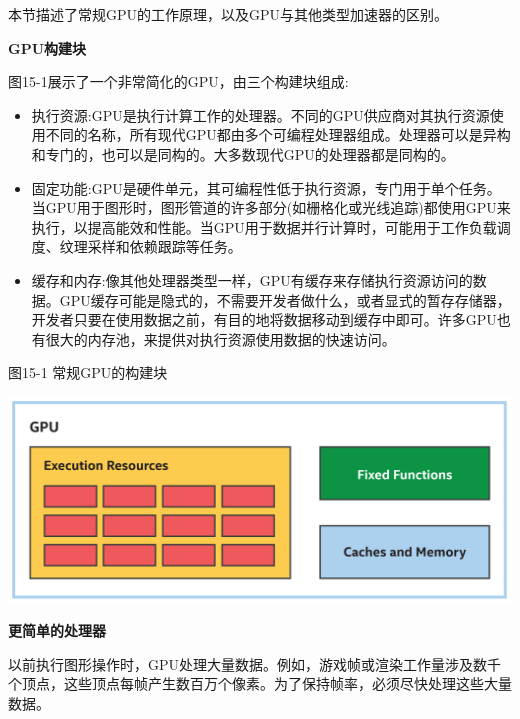 本节描述了常规GPU的工作原理，以及GPU与其他类型加速器的区别。\par

\hspace*{\fill} \par %
\textbf{GPU构建块}

图15-1展示了一个非常简化的GPU，由三个构建块组成:\par

\begin{itemize}
	\item 执行资源:GPU是执行计算工作的处理器。不同的GPU供应商对其执行资源使用不同的名称，所有现代GPU都由多个可编程处理器组成。处理器可以是异构和专门的，也可以是同构的。大多数现代GPU的处理器都是同构的。
	\item 固定功能:GPU是硬件单元，其可编程性低于执行资源，专门用于单个任务。当GPU用于图形时，图形管道的许多部分(如栅格化或光线追踪)都使用GPU来执行，以提高能效和性能。当GPU用于数据并行计算时，可能用于工作负载调度、纹理采样和依赖跟踪等任务。
	\item 缓存和内存:像其他处理器类型一样，GPU有缓存来存储执行资源访问的数据。GPU缓存可能是隐式的，不需要开发者做什么，或者显式的暂存存储器，开发者只要在使用数据之前，有目的地将数据移动到缓存中即可。许多GPU也有很大的内存池，来提供对执行资源使用数据的快速访问。
\end{itemize}

\hspace*{\fill} \par %
图15-1 常规GPU的构建块
\begin{center}
	\includegraphics[width=1.0\textwidth]{content/chapter-15/images/2}
\end{center}

\hspace*{\fill} \par %
\textbf{更简单的处理器}

以前执行图形操作时，GPU处理大量数据。例如，游戏帧或渲染工作量涉及数千个顶点，这些顶点每帧产生数百万个像素。为了保持帧率，必须尽快处理这些大量数据。\par

